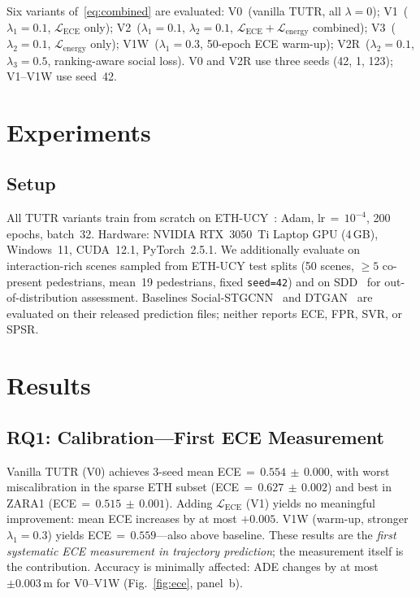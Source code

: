 \documentclass[journal]{IEEEtran}
\begin{document}
Six variants of~\eqref{eq:combined} are evaluated:
V0~(vanilla TUTR, all $\lambda{=}0$);
V1~($\lambda_1{=}0.1$, $\mathcal{L}_{\text{ECE}}$ only);
V2~($\lambda_1{=}0.1$, $\lambda_2{=}0.1$,
$\mathcal{L}_{\text{ECE}}+\mathcal{L}_{\text{energy}}$ combined);
V3~($\lambda_2{=}0.1$, $\mathcal{L}_{\text{energy}}$ only);
V1W~($\lambda_1{=}0.3$, 50-epoch ECE warm-up);
V2R~($\lambda_2{=}0.1$, $\lambda_3{=}0.5$,
ranking-aware social loss).
V0 and V2R use three seeds (42, 1, 123); V1--V1W use seed~42.

\section{Experiments}
\label{sec:experiments}

\subsection{Setup}

All TUTR variants train from scratch on ETH-UCY~\cite{pellegrini2009eth,
lerner2007ucy}: Adam, lr\,\(=\,10^{-4}\), 200 epochs, batch~32.
Hardware: NVIDIA RTX~3050~Ti Laptop GPU (4\,GB), Windows~11,
CUDA~12.1, PyTorch~2.5.1.
We additionally evaluate on interaction-rich scenes sampled from
ETH-UCY test splits (50 scenes, \(\geq5\) co-present pedestrians,
mean~19 pedestrians, fixed \texttt{seed=42}) and on
SDD~\cite{mangalam2020pecnet} for out-of-distribution assessment.
Baselines Social-STGCNN~\cite{mohamed2020social} and
DTGAN~\cite{xie2024dtgan} are evaluated on their released prediction
files; neither reports ECE, FPR, SVR, or SPSR.

\section{Results}
\label{sec:results}

\subsection{RQ1: Calibration---First ECE Measurement}

Vanilla TUTR (V0) achieves 3-seed mean
ECE\,\(=\,0.554\,\pm\,0.000\), with worst miscalibration in the
sparse ETH subset (ECE\,\(=\,0.627\,\pm\,0.002\)) and best in ZARA1
(ECE\,\(=\,0.515\,\pm\,0.001\)).
Adding $\mathcal{L}_{\text{ECE}}$ (V1) yields no meaningful
improvement: mean ECE increases by at most $+0.005$.
V1W (warm-up, stronger $\lambda_1{=}0.3$) yields
ECE\,\(=\,0.559\)---also above baseline.
These results are the \emph{first systematic ECE measurement in
trajectory prediction}; the measurement itself is the contribution.
Accuracy is minimally affected: ADE changes by at most
$\pm0.003$\,m for V0--V1W (Fig.~\ref{fig:ece}, panel~b).
\end{document}
